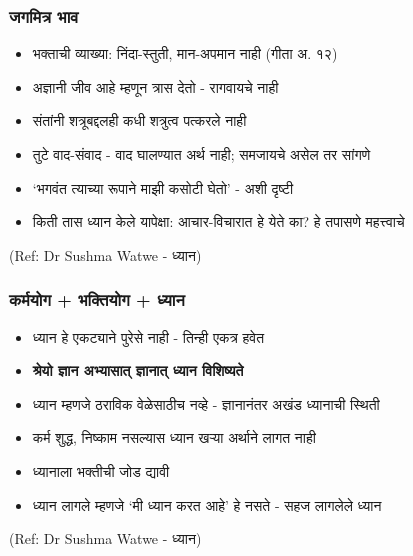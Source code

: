 \begin{frame}[fragile]\frametitle{जगमित्र भाव}

	\begin{itemize}
	\item भक्ताची व्याख्या: निंदा-स्तुती, मान-अपमान नाही (गीता अ. १२)
	\item अज्ञानी जीव आहे म्हणून त्रास देतो - रागवायचे नाही
	\item संतांनी शत्रूबद्दलही कधी शत्रुत्व पत्करले नाही
	\item तुटे वाद-संवाद - वाद घालण्यात अर्थ नाही; समजायचे असेल तर सांगणे
	\item `भगवंत त्याच्या रूपाने माझी कसोटी घेतो' - अशी दृष्टी
	\item किती तास ध्यान केले यापेक्षा: आचार-विचारात हे येते का? हे तपासणे महत्त्वाचे
	\end{itemize}

{\tiny (Ref: Dr Sushma Watwe - ध्यान)}

\end{frame}

\begin{frame}[fragile]\frametitle{कर्मयोग + भक्तियोग + ध्यान}

	\begin{itemize}
	\item ध्यान हे एकट्याने पुरेसे नाही - तिन्ही एकत्र हवेत
	\item \textbf{श्रेयो ज्ञान अभ्यासात् ज्ञानात् ध्यान विशिष्यते}
	\item ध्यान म्हणजे ठराविक वेळेसाठीच नव्हे - ज्ञानानंतर अखंड ध्यानाची स्थिती
	\item कर्म शुद्ध, निष्काम नसल्यास ध्यान खऱ्या अर्थाने लागत नाही
	\item ध्यानाला भक्तीची जोड द्यावी
	\item ध्यान लागले म्हणजे `मी ध्यान करत आहे' हे नसते - सहज लागलेले ध्यान
	\end{itemize}

{\tiny (Ref: Dr Sushma Watwe - ध्यान)}

\end{frame}

